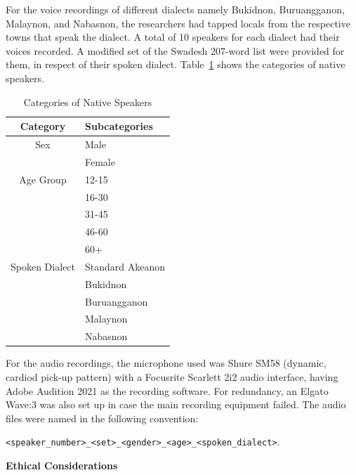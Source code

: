 For the voice recordings of different dialects namely Bukidnon, Buruangganon, Malaynon, and Nabasnon, the researchers had tapped locals from the respective towns that speak the dialect. A total of 10 speakers for each dialect had their voices recorded. A modified set of the Swadesh 207-word list were provided for them, in respect of their spoken dialect. Table~\ref{tab:native_speakers} shows the categories of native speakers. 

\begin{table}[H]
   \centering
   \caption{Categories of Native Speakers} \vspace{0.25em}
   \label{tab:native_speakers}
   \renewcommand{\arraystretch}{1.5} %
   \setlength{\tabcolsep}{10pt} %

\begin{tabular}{|c|p{2in}|} \hline
   \centering Category & Subcategories \\ \hline
   Sex & Male \\ 
   & Female \\ 
   \hline
   Age Group & 
   12-15 \\ 
   & 16-30 \\ 
   & 31-45 \\ 
   & 46-60 \\
   & 60+ \\ \hline
   Spoken Dialect & 
   Standard Akeanon \\ 
   & Bukidnon \\ 
   & Buruangganon \\ 
   & Malaynon \\ 
   & Nabasnon \\ \hline
\end{tabular}
\end{table}

For the audio recordings, the microphone used was Shure SM58 (dynamic, cardiod pick-up pattern) with a Focusrite Scarlett 2i2 audio interface, having Adobe Audition 2021 as the recording software. For redundancy, an Elgato Wave:3 was also set up in case the main recording equipment failed. The audio files were named in the following convention: 

\texttt{\textless speaker\_number\textgreater\_\textless set\textgreater\_\textless gender\textgreater\_\textless age\textgreater\_\textless spoken\_dialect\textgreater}.

\textbf{Ethical Considerations}

